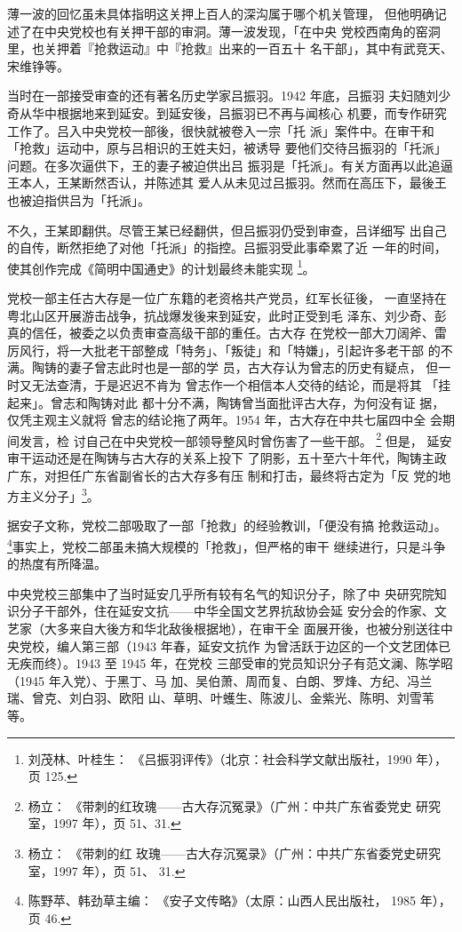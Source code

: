 薄一波的回忆虽未具体指明这关押上百人的深沟属于哪个机关管理，
但他明确记述了在中央党校也有关押干部的审洞。薄一波发现，「在中央
党校西南角的窑洞里，也关押着『抢救运动』中『抢救』出来的一百五十
名干部」，其中有武竞天、宋维铮等。

当时在一部接受审查的还有著名历史学家吕振羽。1942 年底，吕振羽
夫妇随刘少奇从华中根据地来到延安。到延安後，吕振羽已不再与闻核心
机要，而专作研究工作了。吕入中央党校一部後，很快就被卷入一宗「托
派」案件中。在审干和「抢救」运动中，原与吕相识的王姓夫妇，被诱导
要他们交待吕振羽的「托派」问题。在多次逼供下，王的妻子被迫供出吕
振羽是「托派」。有关方面再以此追逼王本人，王某断然否认，并陈述其
爱人从未见过吕振羽。然而在高压下，最後王也被迫指供吕为「托派」。

不久，王某即翻供。尽管王某已经翻供，但吕振羽仍受到审查，吕详细写 出自己
的自传，断然拒绝了对他「托派」的指控。吕振羽受此事牵累了近 一年的时间，
使其创作完成《简明中国通史》的计划最终未能实现 \footnote{刘茂林、叶桂生：
《吕振羽评传》（北京：社会科学文献出版社，1990 年），页 125.}。

党校一部主任古大存是一位广东籍的老资格共产党员，红军长征後， 一直坚持在
粤北山区开展游击战争，抗战爆发後来到延安，此时正受到毛 泽东、刘少奇、彭
真的信任，被委之以负责审查高级干部的重任。古大存 在党校一部大刀阔斧、雷
厉风行，将一大批老干部整成「特务」、「叛徒」和「特嫌」，引起许多老干部
的不满。陶铸的妻子曾志此时也是一部的学 员，古大存认为曾志的历史有疑点，
但一时又无法查清，于是迟迟不肯为 曾志作一个相信本人交待的结论，而是将其
「挂起来」。曾志和陶铸对此 都十分不满，陶铸曾当面批评古大存，为何没有证
据，仅凭主观主义就将 曾志的结论拖了两年。1954 年，古大存在中共七届四中全
会期间发言，检  讨自己在中央党校一部领导整风时曾伤害了一些干部。
\footnote{杨立： 《带刺的红玫瑰——古大存沉冤录》（广州：中共广东省委党史
研究室，1997 年），页 51、31.} 但是， 延安审干运动还是在陶铸与古大存的关系上投下
了阴影，五十至六十年代，陶铸主政 广东，对担任广东省副省长的古大存多有压
制和打击，最终将古定为「反 党的地方主义分子」\footnote{杨立： 《带刺的红
玫瑰——古大存沉冤录》（广州：中共广东省委党史研究室，1997 年），页 51、
31.}。

据安子文称，党校二部吸取了一部「抢救」的经验教训，「便没有搞 抢救运动」。
\footnote{陈野苹、韩劲草主编： 《安子文传略》（太原：山西人民出版社，
1985 年），页 46.}事实上，党校二部虽未搞大规模的「抢救」，但严格的审干
继续进行，只是斗争的热度有所降温。

中央党校三部集中了当时延安几乎所有较有名气的知识分子，除了中
央研究院知识分子干部外，住在延安文抗——中华全国文艺界抗敌协会延
安分会的作家、文艺家（大多来自大後方和华北敌後根据地），在审干全
面展开後，也被分别送往中央党校，编人第三部（1943 年春，延安文抗作
为曾活跃于边区的一个文艺团体已无疾而终）。1943 至 1945 年，在党校
三部受审的党员知识分子有范文澜、陈学昭（1945 年入党）、于黑丁、马
加、吴伯萧、周而复、白朗、罗烽、方纪、冯兰瑞、曾克、刘白羽、欧阳
山、草明、叶蠖生、陈波儿、金紫光、陈明、刘雪苇等。

